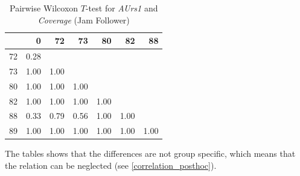 \begin{table}[ht!]
	\tiny
	\centering
	\begin{tabular}{rrrrrrr}
		\toprule
		& 0 & 72 & 73 & 80 & 82 & 88 \\ 
		\midrule
		72 & 0.28 &  &  &  &  &  \\ 
		73 & 1.00 & 1.00 &  &  &  &  \\ 
		80 & 1.00 & 1.00 & 1.00 &  &  &  \\ 
		82 & 1.00 & 1.00 & 1.00 & 1.00 &  &  \\ 
		88 & 0.33 & 0.79 & 0.56 & 1.00 & 1.00 &  \\ 
		89 & 1.00 & 1.00 & 1.00 & 1.00 & 1.00 & 1.00 \\ 
		\bottomrule
	  \end{tabular}
    \caption{Pairwise Wilcoxon $T$-test for \textit{AUrs1} and \textit{Coverage} (Jam Follower)}
    \label{tbl:wilcoxon_baysis_follower_AUrs1_Cov}
\end{table}
The tables shows that the differences are not group specific, which means that the relation can be neglected (see \cref{correlation_posthoc}). 




